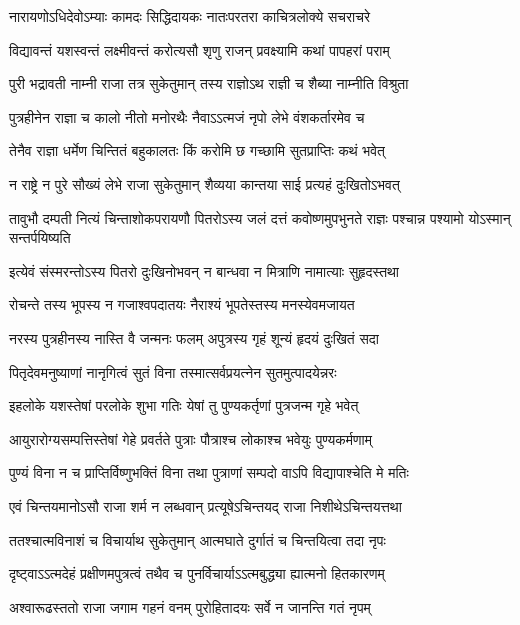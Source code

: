 \twolineshloka
{नारायणोऽधिदेवोऽम्याः कामदः सिद्धिदायकः}
{नातःपरतरा काचित्रलोक्ये सचराचरे} %

\twolineshloka
{विद्यावन्तं यशस्वन्तं लक्ष्मीवन्तं करोत्यसौ}
{शृणु राजन् प्रवक्ष्यामि कथां पापहरां पराम्} %

\twolineshloka
{पुरी भद्रावती नाम्नी राजा तत्र सुकेतुमान्}
{तस्य राज्ञोऽथ राज्ञी च शैब्या नाम्नीति विश्रुता} %

\twolineshloka
{पुत्रहीनेन राज्ञा च कालो नीतो मनोरथैः}
{नैवाऽऽत्मजं नृपो लेभे वंशकर्तारमेव च} %

\twolineshloka
{तेनैव राज्ञा धर्मेण चिन्तितं बहुकालतः}
{किं करोमि छ गच्छामि सुतप्राप्तिः कथं भवेत्} %

\twolineshloka
{न राष्ट्रे न पुरे सौख्यं लेभे राजा सुकेतुमान्}
{शैव्यया कान्तया साई प्रत्यहं दुःखितोऽभवत्} %


\threelineshloka
{तावुभौ दम्पती नित्यं चिन्ताशोकपरायणौ}
{पितरोऽस्य जलं दत्तं कवोष्णमुपभुनते}
{राज्ञः पश्चान्न पश्यामो योऽस्मान् सन्तर्पयिष्यति} %

\twolineshloka
{इत्येवं संस्मरन्तोऽस्य पितरो दुःखिनोभवन्}
{न बान्धवा न मित्राणि नामात्याः सुहृदस्तथा} %

\twolineshloka
{रोचन्ते तस्य भूपस्य न गजाश्वपदातयः}
{नैराश्यं भूपतेस्तस्य मनस्येवमजायत} %

\twolineshloka
{नरस्य पुत्रहीनस्य नास्ति वै जन्मनः फलम्}
{अपुत्रस्य गृहं शून्यं हृदयं दुःखितं सदा} %

\twolineshloka
{पितृदेवमनुष्याणां नानृगित्वं सुतं विना}
{तस्मात्सर्वप्रयत्नेन सुतमुत्पादयेन्नरः} %

\twolineshloka
{इहलोके यशस्तेषां परलोके शुभा गतिः}
{येषां तु पुण्यकर्तृणां पुत्रजन्म गृहे भवेत्} %

\twolineshloka
{आयुरारोग्यसम्पत्तिस्तेषां गेहे प्रवर्तते}
{पुत्राः पौत्राश्च लोकाश्च भवेयुः पुण्यकर्मणाम्} %

\twolineshloka
{पुण्यं विना न च प्राप्तिर्विष्णुभक्तिं विना तथा}
{पुत्राणां सम्पदो वाऽपि विद्यापाश्चेति मे मतिः} %

\twolineshloka
{एवं चिन्तयमानोऽसौ राजा शर्म न लब्धवान्}
{प्रत्यूषेऽचिन्तयद् राजा निशीथेऽचिन्तयत्तथा} %

\twolineshloka
{ततश्चात्मविनाशं च विचार्याथ सुकेतुमान्}
{आत्मघाते दुर्गातं च चिन्तयित्वा तदा नृपः} %

\twolineshloka
{दृष्ट्वाऽऽत्मदेहं प्रक्षीणमपुत्रत्वं तथैव च}
{पुनर्विचार्याऽऽत्मबुद्ध्या ह्यात्मनो हितकारणम्} %

\twolineshloka
{अश्वारूढस्ततो राजा जगाम गहनं वनम्}
{पुरोहितादयः सर्वे न जानन्ति गतं नृपम्} %

